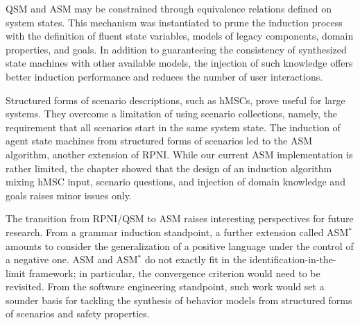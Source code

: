 QSM and ASM may be constrained through equivalence relations defined on system states. This mechanism was instantiated to prune the induction process with the definition of fluent state variables, models of legacy components, domain properties, and goals. In addition to guaranteeing the consistency of synthesized state machines with other available models, the injection of such knowledge offers better induction performance and reduces the number of user interactions.

Structured forms of scenario descriptions, such as hMSCs, prove useful for large systems. They overcome a limitation of using scenario collections, namely, the requirement that all scenarios start in the same system state. The induction of agent state machines from structured forms of scenarios led to the ASM algorithm, another extension of RPNI. While our current ASM implementation is rather limited, the chapter showed that the design of an induction algorithm mixing hMSC input, scenario questions, and injection of domain knowledge and goals raises minor issues only.

The transition from RPNI/QSM to ASM raises interesting perspectives for future research. From a grammar induction standpoint, a further extension called ASM$^*$ amounts to consider the generalization of a positive language under the control of a negative one. ASM and ASM$^*$ do not exactly fit in the identification-in-the-limit framework; in particular, the convergence criterion would need to be revisited. From the software engineering standpoint, such work would set a sounder basis for tackling the synthesis of behavior models from structured forms of scenarios and safety properties.

